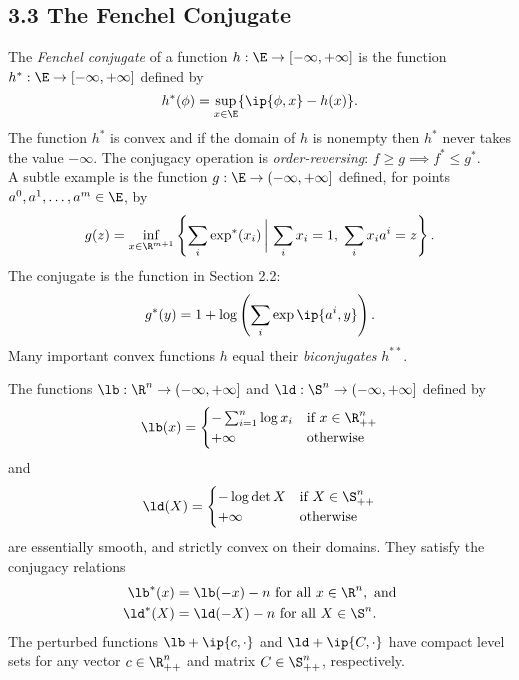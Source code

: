 \documentclass[../borwein-lewis_notes.tex]{subfiles}
\begin{document}
\maketitle
\subsection{3.3 The Fenchel Conjugate}
The \textit{Fenchel conjugate} of a function $h:\E\to[-\infty,+\infty]$ 
is the function $h^*:\E\to[-\infty,+\infty]$ defined by 
\begin{equation*}
h^*(\phi) = \sup_{x\in\E}\{\ip{\phi, x}-h(x)\}.
\end{equation*}
The function $h^*$ is convex and if the domain of $h$ is nonempty 
then $h^*$ never takes the value $-\infty$. The conjugacy operation 
is \textit{order-reversing}: $f\geq g\implies f^*\leq g^*$. \\
A subtle example is the function $g:\E\to(-\infty,+\infty]$ defined,
for points $a^0,a^1,\ldots, a^m\in \E$, by 
\begin{equation}
g(z) = \inf_{x\in\R^{m+1}}\left\{\sum_i \exp^*(x_i)\,\bigg|\,
\sum_i x_i=1,\;\sum_i x_ia^i=z\right\}.
\label{3.3.1}
\end{equation}
The conjugate is the function in Section 2.2: 
\begin{equation}
g^*(y) = 1+\log\left(\sum_i\exp\ip{a^i,y}\right).
\label{3.3.2}
\end{equation}
Many important convex functions $h$ equal their \textit{biconjugates}
$h^{**}$.
\begin{proposition}
The functions $\lb:\R^n\to(-\infty,+\infty]$ and $\ld:\S^n\to(-\infty,
+\infty]$ defined by 
\begin{equation*}
\lb(x) = \begin{cases} -\sum_{i=1}^n \log x_i &\text{if }x\in\R_{++}^n\\
+\infty &\text{otherwise}\end{cases}
\end{equation*}
and 
\begin{equation*}
\ld(X) = \begin{cases} -\log\det X& \text{if }X\in\S_{++}^n \\
+\infty &\text{otherwise}\end{cases}
\end{equation*}
are essentially smooth, and strictly convex on their domains. They 
satisfy the conjugacy relations
\begin{align*}
\lb^*(x) &= \lb(-x)-n\text{ for all }x\in\R^n, \text{ and}\\
\ld^*(X) &= \ld(-X)-n \text{ for all }X\in\S^n.
\end{align*}
The perturbed functions $\lb+\ip{c,\cdot}$ and $\ld+\ip{C,\cdot}$ have 
compact level sets for any vector $c\in\R_{++}^n$ and matrix 
$C\in\S_{++}^n$, respectively.
\label{3.3.3}
\end{proposition}
\end{document}
